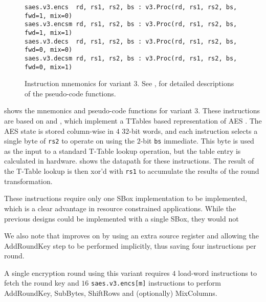 
\begin{figure}
\begin{lstlisting}[language=pseudo,style=block]
saes.v3.encs  rd, rs1, rs2, bs : v3.Proc(rd, rs1, rs2, bs, fwd=1, mix=0)
saes.v3.encsm rd, rs1, rs2, bs : v3.Proc(rd, rs1, rs2, bs, fwd=1, mix=1)
saes.v3.decs  rd, rs1, rs2, bs : v3.Proc(rd, rs1, rs2, bs, fwd=0, mix=0)
saes.v3.decsm rd, rs1, rs2, bs : v3.Proc(rd, rs1, rs2, bs, fwd=0, mix=1)
\end{lstlisting}
\caption{
    Instruction mnemonics for variant 3.
    See ,  for detailed
    descriptions of the pseudo-code functions.
}
\label{fig:mnemonics:v3}
\end{figure}

 shows the mnemonics and pseudo-code functions
for variant 3.
These instructions are based on
\cite{BBFR:06} and \cite{Saarinen:20},
which implement a TTables based representation of AES \cite{DaeRik:02}.
The AES state is stored column-wise in $4$ $32$-bit words, and
each instruction selects a single byte of {\tt rs2} to operate on
using the $2$-bit {\tt bs} immediate.
This byte is used as the input to a standard T-Table lookup operation,
but the table entry is calculated in hardware.
 shows the datapath for these instructions.
The result of the T-Table lookup is then xor'd with {\tt rs1} to
accumulate the results of the round transformation.

These instructions require only one SBox implementation to be implemented,
which is a clear advantage in resource constrained applications.
While the previous designs could be implemented with a single SBox, they
would not

We also note that \cite{Saarinen:20} improves on \cite{BBFR:06}
by using an extra source register and allowing the AddRoundKey step to be
performed implicitly, thus saving four instructions per round.

A single encryption round using this variant requires
$4$ load-word instructions to fetch the round key and
$16$ {\tt saes.v3.encs[m]} instructions to perform AddRoundKey,
SubBytes, ShiftRows and (optionally) MixColumns.

